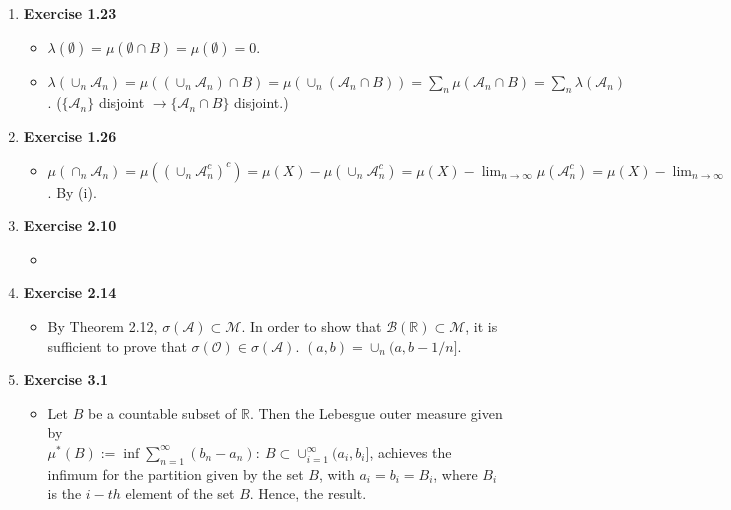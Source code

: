 \documentclass[12pt, letterpaper,bibtotoc, tablecaptionabove, figurecaptionabove]{article}
\begin{document}
\begin{enumerate}
\begin{itemize}
\item  $A=(A\cap B^c)\cup (A\cap B)$ and $B=(B\cap A^c)\cup(B\cap A)$. $\mu(A)+\mu(B)=\mu(A\cap B)+\mu(A\cap B)+\mu(A\cap B^c)+\mu(A^c\cap B)=\mu(A\cap B)+\mu(A\cup B)$. Thus, $\mu(A)+\mu(B)\geq \mu(A\cup B)$. 
\end{itemize}
\item{\bf{Exercise 1.23}}
\begin{itemize}
\item $\lambda(\emptyset)=\mu(\emptyset\cap B)=\mu(\emptyset)=0$.
\item $\lambda(\cup_n \mathcal A_n)=\mu((\cup_n\mathcal A_n)\cap B)=\mu(\cup_n(\mathcal A_n\cap B))=\sum_n\mu(\mathcal A_n\cap B)=\sum_n\lambda(\mathcal A_n)$. ($\{\mathcal A_n\}$ disjoint $\rightarrow \{\mathcal A_n\cap B\}$ disjoint.)
\end{itemize}
\item {\bf{Exercise 1.26}}
\begin{itemize}
\item $\mu(\cap_n\mathcal A_n)=\mu((\cup_n \mathcal A_n^c)^c)=\mu(X)-\mu(\cup_n \mathcal A_n^c)=\mu(X)-\lim_{n\rightarrow\infty}\mu(\mathcal A_n^c)=\mu(X)-\lim_{n\rightarrow\infty}(\mu(X)-\mu(\mathcal A_n))=\lim_{n\rightarrow\infty}\mu(\mathcal A_n)$. By (i).
\end{itemize}
\item{\bf{Exercise 2.10}}
\begin{itemize}
\item []
\end{itemize}
\item{\bf{Exercise 2.14}}
\begin{itemize}
\item By Theorem 2.12, $\sigma(\mathcal A)\subset \mathcal M$. In order to show that $\mathcal B(\mathbb R)\subset \mathcal M$, it is sufficient to prove that $\sigma(\mathcal O)\in \sigma(\mathcal A)$. $(a,b)=\cup_n(a,b-1/n]$.
\end{itemize}

\item{\bf{Exercise 3.1}}
\begin{itemize}
\item Let $B$ be a countable subset of $\mathbb R$. Then the Lebesgue outer measure given by \\
$\mu^*(B):=\inf{\sum_{n=1}^\infty (b_n-a_n) : \ B\subset \cup_{i=1}^\infty (a_i,b_i]}$, achieves the  infimum  for the partition given by the set $B$, with $a_i=b_i=B_i$, where $B_i$is the $i-th$ element of the set $B$. Hence, the result.
\end{itemize}


\end{enumerate}
\end{document}
